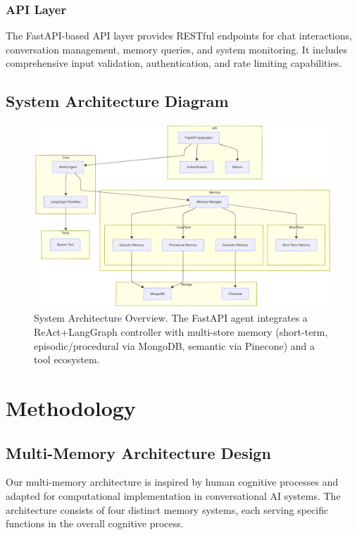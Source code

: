 \documentclass[11pt]{article}
\begin{document}
\subsubsection{API Layer}
The FastAPI-based API layer provides RESTful endpoints for chat interactions, conversation management, memory queries, and system monitoring. It includes comprehensive input validation, authentication, and rate limiting capabilities.

\subsection{System Architecture Diagram}

\begin{figure}[H]
  \centering
  \includegraphics[width=0.95\linewidth]{../../docs/System_Architecture.png}
  \caption{System Architecture Overview. The FastAPI agent integrates a ReAct+LangGraph controller with multi-store memory (short-term, episodic/procedural via MongoDB, semantic via Pinecone) and a tool ecosystem.}
  \label{fig:system}
\end{figure}

\section{Methodology}

\subsection{Multi-Memory Architecture Design}

Our multi-memory architecture is inspired by human cognitive processes and adapted for computational implementation in conversational AI systems. The architecture consists of four distinct memory systems, each serving specific functions in the overall cognitive process.
\end{document}
